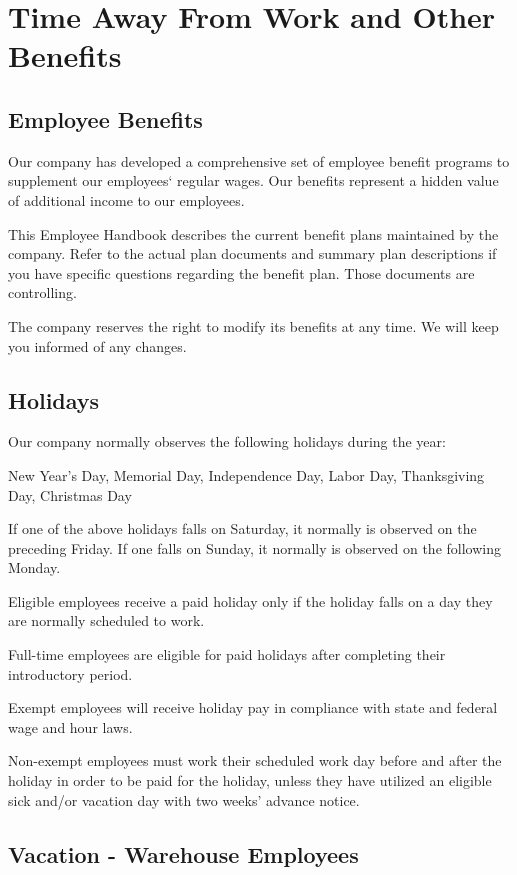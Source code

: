 \section{Time Away From Work and Other Benefits}

\subsection{Employee Benefits}

Our company has developed a comprehensive set of employee benefit programs to supplement our employees‘ regular wages. Our benefits represent a hidden value of additional income to our employees.

This Employee Handbook describes the current benefit plans maintained by the company. Refer to the actual plan documents and summary plan descriptions if you have specific questions regarding the benefit plan. Those documents are controlling.

The company reserves the right to modify its benefits at any time. We will keep you informed of any changes.

\subsection{Holidays}

Our company normally observes the following holidays during the year:

New Year's Day, Memorial Day, Independence Day, Labor Day, Thanksgiving Day, Christmas Day

If one of the above holidays falls on Saturday, it normally is observed on the preceding Friday. If one falls on Sunday, it normally is observed on the following Monday.

Eligible employees receive a paid holiday only if the holiday falls on a day they are normally scheduled to work.

Full-time employees are eligible for paid holidays after completing their introductory period.

Exempt employees will receive holiday pay in compliance with state and federal wage and hour laws.

Non-exempt employees must work their scheduled work day before and after the holiday in order to be paid for the holiday, unless they have utilized an eligible sick and/or vacation day with two weeks’ advance notice.

\subsection{Vacation - Warehouse Employees}

